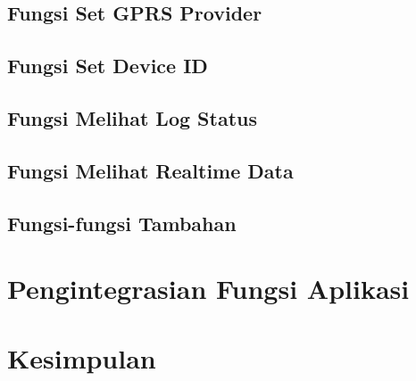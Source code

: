 \subsection{Fungsi Set GPRS Provider}

\subsection{Fungsi Set Device ID}

\subsection{Fungsi Melihat Log Status}

\subsection{Fungsi Melihat Realtime Data}

\subsection{Fungsi-fungsi Tambahan}

\section{Pengintegrasian Fungsi Aplikasi}

\section{Kesimpulan}


